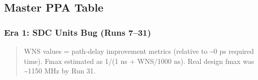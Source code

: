 \subsection{Master PPA Table}\label{cr:run:asap7:master-ppa-table}

\subsubsection{Era 1: SDC Units Bug (Runs 7--31)}\label{cr:run:asap7:era-1-sdc-units-bug-runs-731}

\begin{record}

\begin{quote}
WNS values = path-delay improvement metrics (relative to
\textasciitilde0 ps required time). Fmax estimated as 1/(1 ns +
\textbar WNS\textbar/\allowbreak{}1000 ns). Real design fmax was
\textasciitilde1150 MHz by Run 31.
\end{quote}

\begin{landscape}
\small\setlength{\tabcolsep}{4pt}


\end{landscape}
\end{record}
